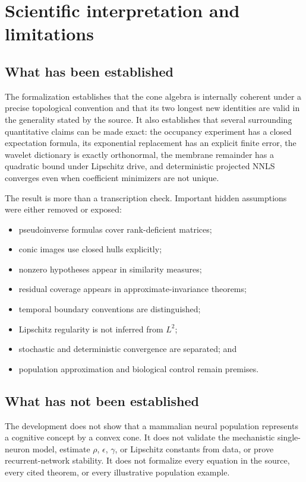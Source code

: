 \documentclass[11pt,a4paper]{article}
\begin{document}
\section{Scientific interpretation and limitations}
\label{sec:limits}

\subsection{What has been established}

The formalization establishes that the cone algebra is internally coherent
under a precise topological convention and that its two longest new
identities are valid in the generality stated by the source. It also
establishes that several surrounding quantitative claims can be made exact:
the occupancy experiment has a closed expectation formula, its exponential
replacement has an explicit finite error, the wavelet dictionary is exactly
orthonormal, the membrane remainder has a quadratic bound under Lipschitz
drive, and deterministic projected NNLS converges even when coefficient
minimizers are not unique.

The result is more than a transcription check. Important hidden assumptions
were either removed or exposed:

\begin{itemize}
  \item pseudoinverse formulas cover rank-deficient matrices;
  \item conic images use closed hulls explicitly;
  \item nonzero hypotheses appear in similarity measures;
  \item residual coverage appears in approximate-invariance theorems;
  \item temporal boundary conventions are distinguished;
  \item Lipschitz regularity is not inferred from \(L^2\);
  \item stochastic and deterministic convergence are separated; and
  \item population approximation and biological control remain premises.
\end{itemize}

\subsection{What has not been established}

The development does not show that a mammalian neural population represents
a cognitive concept by a convex cone. It does not validate the mechanistic
single-neuron model, estimate \(\rho\), \(\epsilon\), \(\gamma\), or
Lipschitz constants from data, or prove recurrent-network stability.
It does not formalize every equation in the source, every cited theorem, or
every illustrative population example.
\end{document}
